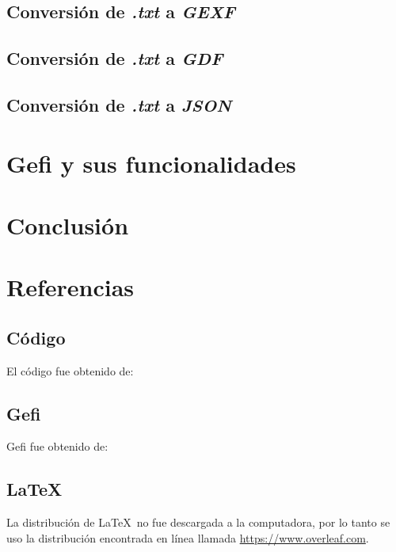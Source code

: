 \documentclass[acmsmall]{acmart}
\begin{document}
\subsection{Conversión de \textit{.txt} a \textit{GEXF}}

\subsection{Conversión de \textit{.txt} a \textit{GDF}}

\subsection{Conversión de \textit{.txt} a \textit{JSON}}

\section{Gefi y sus funcionalidades}

\section{Conclusión}

\section{Referencias}
\subsection{Código}
El código fue obtenido de:

\subsection{Gefi}
Gefi fue obtenido de:

\subsection{LaTeX}
La distribución de \LaTeX\ no fue descargada a la computadora, por lo tanto se uso la distribución encontrada en línea llamada \url{https://www.overleaf.com}.
\end{document}
